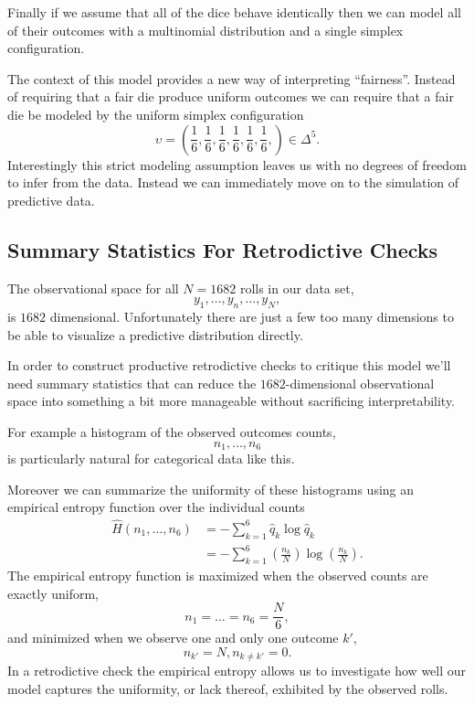 \documentclass[
  letterpaper,
  DIV=11,
  numbers=noendperiod]{scrartcl}
\begin{document}
Finally if we assume that all of the dice behave identically then we can
model all of their outcomes with a multinomial distribution and a single
simplex configuration.

The context of this model provides a new way of interpreting
``fairness''. Instead of requiring that a fair die produce uniform
outcomes we can require that a fair die be modeled by the uniform
simplex configuration \[
\upsilon
=
\left( \frac{1}{6}, \frac{1}{6}, \frac{1}{6},
       \frac{1}{6}, \frac{1}{6}, \frac{1}{6}, \right) \in \Delta^{5}.
\] Interestingly this strict modeling assumption leaves us with no
degrees of freedom to infer from the data. Instead we can immediately
move on to the simulation of predictive data.

\subsection{Summary Statistics For Retrodictive
Checks}\label{summary-statistics-for-retrodictive-checks}

The observational space for all \(N = 1682\) rolls in our data set, \[
y_{1}, \ldots, y_{n}, \ldots, y_{N},
\] is \(1682\) dimensional. Unfortunately there are just a few too many
dimensions to be able to visualize a predictive distribution directly.

In order to construct productive retrodictive checks to critique this
model we'll need summary statistics that can reduce the
\(1682\)-dimensional observational space into something a bit more
manageable without sacrificing interpretability.

For example a histogram of the observed outcomes counts, \[
n_{1}, \ldots, n_{6}
\] is particularly natural for categorical data like this.

Moreover we can summarize the uniformity of these histograms using an
empirical entropy function over the individual counts \begin{align*}
\hat{H}(n_{1}, \ldots, n_{6})
&=
- \sum_{k = 1}^{6} \hat{q}_{k} \log \hat{q}_{k}
\\
&=
- \sum_{k = 1}^{6}
\left( \frac{n_{k}}{N} \right) \log \left( \frac{n_{k}}{N} \right).
\end{align*} The empirical entropy function is maximized when the
observed counts are exactly uniform, \[
n_{1} = \ldots = n_{6} = \frac{N}{6},
\] and minimized when we observe one and only one outcome \(k'\), \[
n_{k'} = N, n_{k \ne k'} = 0.
\] In a retrodictive check the empirical entropy allows us to
investigate how well our model captures the uniformity, or lack thereof,
exhibited by the observed rolls.
\end{document}
